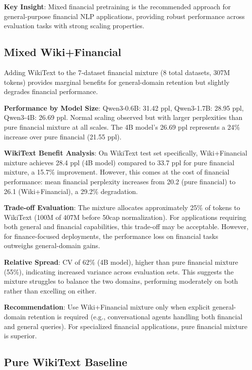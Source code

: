 \textbf{Key Insight}: Mixed financial pretraining is the recommended approach for general-purpose financial NLP applications, providing robust performance across evaluation tasks with strong scaling properties.

\subsection{Mixed Wiki+Financial}

Adding WikiText to the 7-dataset financial mixture (8 total datasets, 307M tokens) provides marginal benefits for general-domain retention but slightly degrades financial performance.

\textbf{Performance by Model Size}: Qwen3-0.6B: 31.42 ppl, Qwen3-1.7B: 28.95 ppl, Qwen3-4B: 26.69 ppl. Normal scaling observed but with larger perplexities than pure financial mixture at all scales. The 4B model's 26.69 ppl represents a 24\% increase over pure financial (21.55 ppl).

\textbf{WikiText Benefit Analysis}: On WikiText test set specifically, Wiki+Financial mixture achieves 28.4 ppl (4B model) compared to 33.7 ppl for pure financial mixture, a 15.7\% improvement. However, this comes at the cost of financial performance: mean financial perplexity increases from 20.2 (pure financial) to 26.1 (Wiki+Financial), a 29.2\% degradation.

\textbf{Trade-off Evaluation}: The mixture allocates approximately 25\% of tokens to WikiText (100M of 407M before 50cap normalization). For applications requiring both general and financial capabilities, this trade-off may be acceptable. However, for finance-focused deployments, the performance loss on financial tasks outweighs general-domain gains.

\textbf{Relative Spread}: CV of 62\% (4B model), higher than pure financial mixture (55\%), indicating increased variance across evaluation sets. This suggests the mixture struggles to balance the two domains, performing moderately on both rather than excelling on either.

\textbf{Recommendation}: Use Wiki+Financial mixture only when explicit general-domain retention is required (e.g., conversational agents handling both financial and general queries). For specialized financial applications, pure financial mixture is superior.

\subsection{Pure WikiText Baseline}

